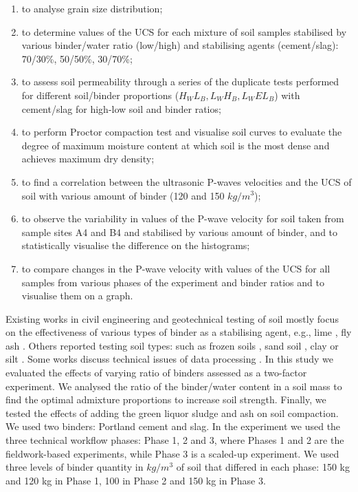 \documentclass{amestyle}
\begin{document}
\begin{enumerate}
   \item to analyse grain size distribution;
   \item to determine values of the UCS for each mixture of soil samples stabilised by various binder/water ratio (low/high) and stabilising agents (cement/slag): 70/30\%, 50/50\%, 30/70\%; 
  \item to assess soil permeability through a series of the duplicate tests performed for different soil/binder proportions ($H_WL_B,L_WH_B,L_WEL_B$) with cement/slag for high-low soil and binder ratios;
  \item to perform Proctor compaction test and visualise soil curves to evaluate the degree of maximum moisture content at which soil is the most dense and achieves maximum dry density;
  \item to find a correlation between the ultrasonic P-waves velocities and the UCS of soil with various amount of binder (120 and 150 $kg/m^3$);
  \item to observe the variability in values of the P-wave velocity for soil taken from sample sites A4 and B4 and stabilised by various amount of binder, and to statistically visualise the difference on the histograms;
  \item to compare changes in the P-wave velocity with values of the UCS for all samples from various phases of the experiment and binder ratios and to visualise them on a graph.
\end{enumerate}

Existing works in civil engineering and geotechnical testing of soil mostly focus on the effectiveness of various types of binder as a stabilising agent, e.g., lime \cite{Rao,Mukhtar,Swaidani}, fly ash \cite{Phetchuay}. Others reported testing soil types: such as frozen soils \cite{Lemenkov2021b,Lemenkov2021c}, sand soil \cite{Robertson}, clay or silt \cite{Komal}. Some works discuss technical issues of data processing \cite{Kaellenetal2014,Lemenkov2021c}. In this study we evaluated the effects of varying ratio of binders assessed as a two-factor experiment. We analysed the ratio of the binder/water content in a soil mass to find the optimal admixture proportions to increase soil strength. Finally, we tested the effects of adding the green liquor sludge and ash on soil compaction. We used two binders: Portland cement and slag. In the experiment we used the three technical workflow phases: Phase 1, 2 and 3, where Phases 1 and 2 are the fieldwork-based experiments, while Phase 3 is a scaled-up experiment. We used three levels of binder quantity in $kg/m^3$ of soil that differed in each phase: 150 kg and 120 kg in Phase 1, 100 in Phase 2 and 150 kg in Phase 3.
\end{document}
